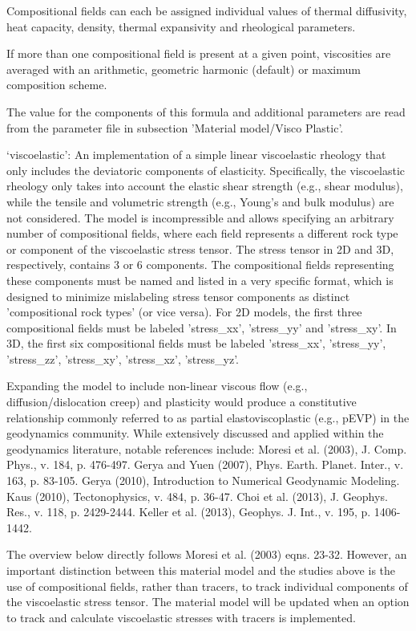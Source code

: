 \begin{itemize}
 Compositional fields can each be assigned individual values of thermal diffusivity, heat capacity, density, thermal expansivity and rheological parameters. 

 If more than one compositional field is present at a given point, viscosities are averaged with an arithmetic, geometric harmonic (default) or maximum composition scheme. 

 The value for the components of this formula and additional parameters are read from the parameter file in subsection  'Material model/Visco Plastic'.

`viscoelastic': An implementation of a simple linear viscoelastic rheology that only includes the deviatoric components of elasticity. Specifically, the viscoelastic rheology only takes into account the elastic shear strength (e.g., shear modulus), while the tensile and volumetric strength (e.g., Young's and bulk modulus) are not considered. The model is incompressible and allows specifying an arbitrary number of compositional fields, where each field represents a different rock type or component of the viscoelastic stress tensor. The stress tensor in 2D and 3D, respectively, contains 3 or 6 components. The compositional fields representing these components must be named and listed in a very specific format, which is designed to minimize mislabeling stress tensor components as distinct 'compositional rock types' (or vice versa). For 2D models, the first three compositional fields must be labeled 'stress\_xx', 'stress\_yy' and 'stress\_xy'. In 3D, the first six compositional fields must be labeled 'stress\_xx', 'stress\_yy', 'stress\_zz', 'stress\_xy', 'stress\_xz', 'stress\_yz'. 

 Expanding the model to include non-linear viscous flow (e.g., diffusion/dislocation creep) and plasticity would produce a constitutive relationship commonly referred to as partial elastoviscoplastic (e.g., pEVP) in the geodynamics community. While extensively discussed and applied within the geodynamics literature, notable references include: Moresi et al. (2003), J. Comp. Phys., v. 184, p. 476-497. Gerya and Yuen (2007), Phys. Earth. Planet. Inter., v. 163, p. 83-105. Gerya (2010), Introduction to Numerical Geodynamic Modeling. Kaus (2010), Tectonophysics, v. 484, p. 36-47. Choi et al. (2013), J. Geophys. Res., v. 118, p. 2429-2444. Keller et al. (2013), Geophys. J. Int., v. 195, p. 1406-1442. 

 The overview below directly follows Moresi et al. (2003) eqns. 23-32. However, an important distinction between this material model and the studies above is the use of compositional fields, rather than tracers, to track individual components of the viscoelastic stress tensor. The material model will be updated when an option to track and calculate viscoelastic stresses with tracers is implemented. 


\end{itemize}
